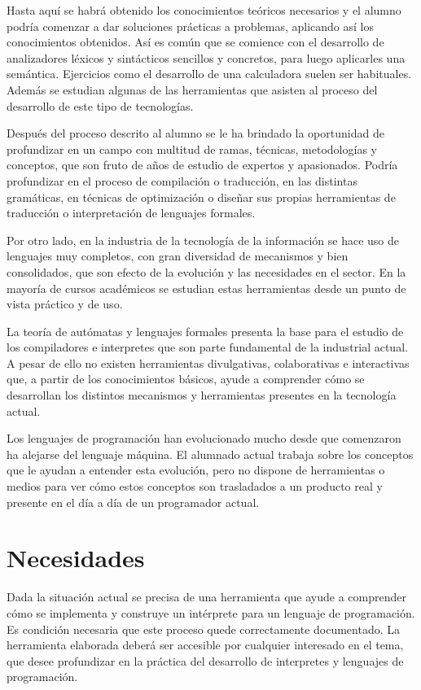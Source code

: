 Hasta aquí se habrá obtenido los conocimientos teóricos necesarios y el alumno podría comenzar a dar soluciones prácticas a problemas, aplicando así los conocimientos obtenidos. Así es
común que se comience con el desarrollo de analizadores léxicos y sintácticos sencillos y concretos, para luego aplicarles una semántica. Ejercicios como el desarrollo de 
una calculadora suelen ser habituales. Además se estudian algunas de las herramientas que asisten al proceso del desarrollo de este tipo de tecnologías.

Después del proceso descrito al alumno se le ha brindado la oportunidad de profundizar en un campo con multitud de ramas, técnicas, metodologías y conceptos, que son fruto de años de 
estudio de expertos y apasionados. Podría profundizar en el proceso de compilación o traducción, en las distintas gramáticas, en técnicas de optimización o diseñar sus propias herramientas 
de traducción o interpretación de lenguajes formales.

Por otro lado, en la industria de la tecnología de la información se hace uso de lenguajes muy completos, con gran diversidad de mecanismos y bien consolidados, que son efecto de la evolución 
y las necesidades en el sector. En la mayoría de cursos académicos se estudian estas herramientas desde un punto de vista práctico y de uso. 

La teoría de autómatas y lenguajes formales presenta la base para el estudio de los compiladores e interpretes que son parte fundamental de la industrial 
actual. A pesar de ello no existen herramientas divulgativas, colaborativas e interactivas que, a partir de los conocimientos básicos, ayude a comprender cómo se desarrollan los distintos 
mecanismos y herramientas presentes en la tecnología actual.

Los lenguajes de programación han evolucionado mucho desde que comenzaron ha alejarse del lenguaje máquina. El alumnado actual trabaja sobre los conceptos que le ayudan a entender esta evolución, 
pero no dispone de herramientas o medios para ver cómo estos conceptos son trasladados a un producto real y presente en el día a día de un programador actual. 

\section{Necesidades}
Dada la situación actual se precisa de una herramienta que ayude a comprender cómo se implementa y construye un intérprete para un lenguaje de programación. Es condición necesaria que 
este proceso quede correctamente documentado. La herramienta elaborada deberá ser accesible por cualquier interesado en el tema, que desee profundizar en la práctica del desarrollo
de interpretes y lenguajes de programación. 

